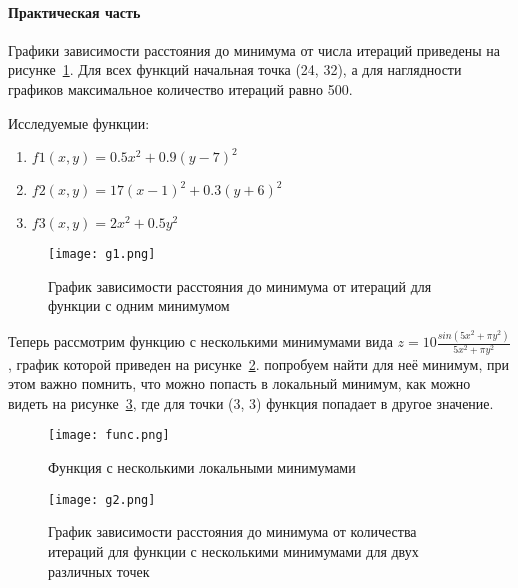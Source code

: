 \documentclass[14pt]{matmex-diploma-custom}
\begin{document}
\clearpage
\paragraph{Практическая часть}
Графики зависимости расстояния до минимума от числа итераций приведены на рисунке~\ref{gradient}.
Для всех функций начальная точка (24, 32), а для наглядности графиков максимальное количество итераций равно 500.

\par
Исследуемые функции:

\begin{enumerate}
    \item \( f1(x,y) = 0.5x^2+0.9(y-7)^2 \)
    \item \( f2(x,y) = 17(x-1)^2+0.3(y+6)^2 \)
    \item \( f3(x,y) = 2x^2+0.5y^2 \)
\end{enumerate}

\begin{figure}[h]
    \center
    \texttt{[image: g1.png]}
    \caption{График зависимости расстояния до минимума от итераций для функции с одним минимумом}
    \label{gradient}    
\end{figure}

Теперь рассмотрим функцию с несколькими минимумами вида \newline
\( z = 10 \frac{sin (5x^2 + \pi y ^2)}{5x^2 + \pi y ^2} \), график которой приведен на рисунке~\ref{megafunc}. \)
попробуем найти для неё минимум, при этом важно помнить, 
что можно попасть в локальный минимум, как можно видеть на рисунке~\ref{crazy}, где для точки (3, 3) функция попадает в другое значение.

\begin{figure}[h]
    \center
    \texttt{[image: func.png]}
    \caption{Функция с несколькими локальными минимумами}
    \label{megafunc}    
\end{figure}
\begin{figure}[h]
    \center
    \texttt{[image: g2.png]}
    \caption{График зависимости расстояния до минимума от количества итераций для функции с несколькими минимумами для двух различных точек}
    \label{crazy}    
\end{figure}
\end{document}
